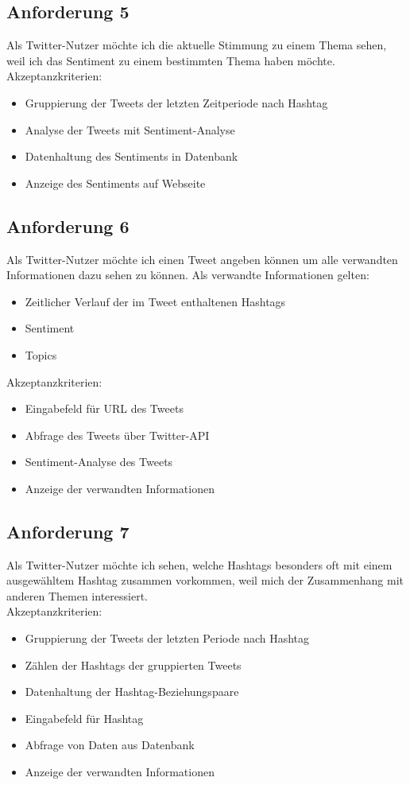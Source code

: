 \documentclass[conference]{IEEEtran}
\begin{document}
\subsection{Anforderung 5}
Als Twitter-Nutzer möchte ich die aktuelle Stimmung zu einem Thema sehen,
weil ich das Sentiment zu einem bestimmten Thema haben möchte.
\\
Akzeptanzkriterien:
\begin{itemize}
        \item Gruppierung der Tweets der letzten Zeitperiode nach Hashtag
        \item Analyse der Tweets mit Sentiment-Analyse
        \item Datenhaltung des Sentiments in Datenbank
        \item Anzeige des Sentiments auf Webseite
\end{itemize}

\subsection{Anforderung 6}
Als Twitter-Nutzer möchte ich einen Tweet angeben können um alle verwandten Informationen dazu sehen zu können.
Als verwandte Informationen gelten:
\begin{itemize}
        \item Zeitlicher Verlauf der im Tweet enthaltenen Hashtags
        \item Sentiment
        \item Topics
\end{itemize}
Akzeptanzkriterien:
\begin{itemize}
        \item Eingabefeld für URL des Tweets
        \item Abfrage des Tweets über Twitter-API
        \item Sentiment-Analyse des Tweets
        \item Anzeige der verwandten Informationen
\end{itemize}

\subsection{Anforderung 7}
Als Twitter-Nutzer möchte ich sehen,
welche Hashtags besonders oft mit einem ausgewähltem Hashtag zusammen vorkommen,
weil mich der Zusammenhang mit anderen Themen interessiert.
\\
Akzeptanzkriterien:
\begin{itemize}
        \item Gruppierung der Tweets der letzten Periode nach Hashtag
        \item Zählen der Hashtags der gruppierten Tweets
        \item Datenhaltung der Hashtag-Beziehungspaare
        \item Eingabefeld für Hashtag
        \item Abfrage von Daten aus Datenbank
        \item Anzeige der verwandten Informationen
\end{itemize}
\end{document}
